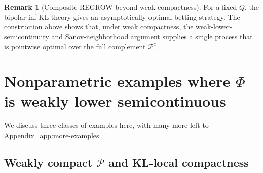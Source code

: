 \documentclass[11pt]{article}
\newcommand{\KL}{\mathrm{KL}}
\newcommand{\dinfKL}{d_{\mathrm{infKL}}}
\newcommand{\E}{\mathbb{E}}
\newcommand{\Pcal}{\mathcal{P}}
\newcommand{\Qcal}{\mathcal{Q}}
\theoremstyle{definition}
\newtheorem{remark}[theorem]{Remark}
\theoremstyle{definition}
\begin{document}

\begin{remark}[Composite REGROW beyond weak compactness]
For a fixed $Q$, the bipolar inf-KL theory gives an asymptotically optimal betting strategy.  The construction above shows that, under weak compactness, the weak-lower-semicontinuity and Sanov-neighborhood argument supplies a single process that is pointwise optimal over the full complement $\Pcal^c$.
\end{remark}

\section{Nonparametric examples where \texorpdfstring{$\Phi$}{Phi} is weakly lower semicontinuous}\label{sec:examples}

We discuss three classes of examples here, with many more left to Appendix~\ref{app:more-examples}.

\subsection{Weakly compact \texorpdfstring{$\Pcal$}{P} and KL-local compactness}
\end{document}
